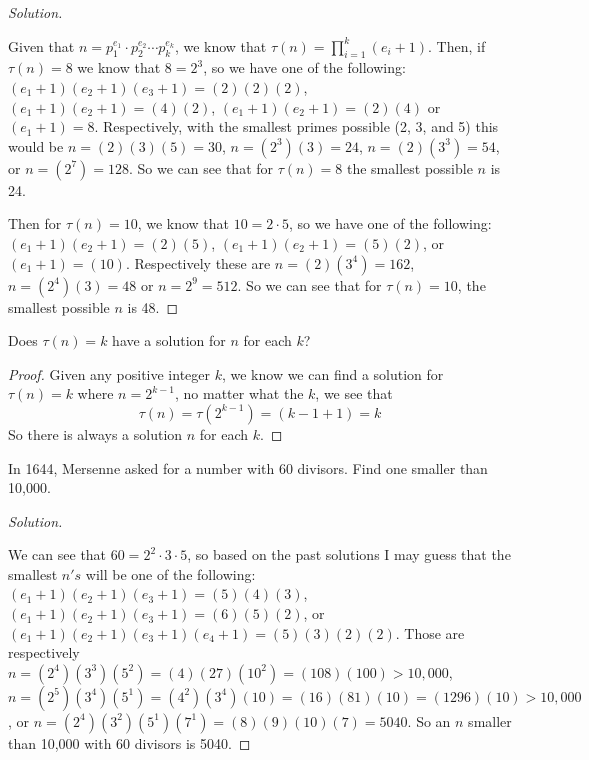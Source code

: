 \documentclass[11pt]{article}
\newenvironment{problem}[2][Problem]{\begin{trivlist}
\item[\hskip \labelsep {\bfseries #1}\hskip \labelsep {\bfseries #2.}]}{\end{trivlist}}
\newenvironment{solution}
  {\renewcommand\qedsymbol{$~$}\begin{proof}[Solution]$ $\par\nobreak\ignorespaces}
  {\end{proof}}
\begin{document}
\begin{solution}
    Given that $n=p_1^{e_1}\cdot p_2^{e_2} \cdots p_k^{e_k}$, we know that $\tau(n)=\prod^{k}_{i=1} (e_i+1)$. Then, if $\tau(n)=8$ we know that $8=2^3$, so we have one of the following: $(e_1+1)(e_2+1)(e_3+1)=(2)(2)(2)$, $(e_1+1)(e_2+1)=(4)(2)$, $(e_1+1)(e_2+1)=(2)(4)$ or $(e_1+1)=8$. Respectively, with the smallest primes possible (2, 3, and 5) this would be $n=(2)(3)(5) = 30$, $n=(2^3)(3)=24$, $n=(2)(3^3)=54$, or $n=(2^7)=128$. So we can see that for $\tau(n)=8$ the smallest possible $n$ is 24.

    Then for $\tau(n)=10$, we know that $10=2\cdot 5$, so we have one of the following: $(e_1+1)(e_2+1)=(2)(5)$, $(e_1+1)(e_2+1)=(5)(2)$, or $(e_1+1)=(10)$. Respectively these are $n=(2)(3^4)=162$, $n=(2^4)(3)=48$ or $n=2^{9}=512$. So we can see that for $\tau(n)=10$, the smallest possible $n$ is 48.
\end{solution}



\begin{problem}{8}
Does $\tau(n)=k$ have a solution for $n$ for each $k$?
\end{problem}

\begin{proof}
    Given any positive integer $k$, we know we can find a solution for $\tau(n)=k$ where $n=2^{k-1}$, no matter what the $k$, we see that
    \[
        \tau(n) = \tau(2^{k-1}) = (k-1+1) = k
    \]
    So there is always a solution $n$ for each $k$.
\end{proof}




\begin{problem}{9}
In 1644, Mersenne asked for a number with 60 divisors. Find one smaller than 10,000.
\end{problem}

\begin{solution}
    We can see that $60=2^{2} \cdot 3 \cdot 5$, so based on the past solutions I may guess that the smallest $n's$ will be one of the following: $(e_1+1)(e_2+1)(e_3+1)=(5)(4)(3)$, $(e_1+1)(e_2+1)(e_3+1)=(6)(5)(2)$, or $(e_1+1)(e_2+1)(e_3+1)(e_4+1)=(5)(3)(2)(2)$. Those are respectively $n=(2^4)(3^3)(5^2)=(4)(27)(10^{2})=(108)(100)>10,000$, $n=(2^5)(3^4)(5^1)=(4^2)(3^4)(10)=(16)(81)(10)=(1296)(10)>10,000$, or $n=(2^4)(3^2)(5^1)(7^1)=(8)(9)(10)(7)=5040$. So an $n$ smaller than 10,000 with 60 divisors is 5040.
\end{solution}
\end{document}
